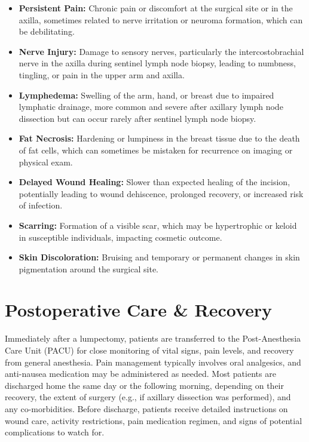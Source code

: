 \begin{itemize}
\begin{itemize}
      \item \textbf{Persistent Pain:} Chronic pain or discomfort at the surgical site or in the axilla, sometimes related to nerve irritation or neuroma formation, which can be debilitating.
      
      \item \textbf{Nerve Injury:} Damage to sensory nerves, particularly the intercostobrachial nerve in the axilla during sentinel lymph node biopsy, leading to numbness, tingling, or pain in the upper arm and axilla.
      
      \item \textbf{Lymphedema:} Swelling of the arm, hand, or breast due to impaired lymphatic drainage, more common and severe after axillary lymph node dissection but can occur rarely after sentinel lymph node biopsy.
      
      \item \textbf{Fat Necrosis:} Hardening or lumpiness in the breast tissue due to the death of fat cells, which can sometimes be mistaken for recurrence on imaging or physical exam.
      
      \item \textbf{Delayed Wound Healing:} Slower than expected healing of the incision, potentially leading to wound dehiscence, prolonged recovery, or increased risk of infection.
      
      \item \textbf{Scarring:} Formation of a visible scar, which may be hypertrophic or keloid in susceptible individuals, impacting cosmetic outcome.
      
      \item \textbf{Skin Discoloration:} Bruising and temporary or permanent changes in skin pigmentation around the surgical site.
    \end{itemize}
\end{itemize}

\section*{Postoperative Care \& Recovery}
Immediately after a lumpectomy, patients are transferred to the Post-Anesthesia Care Unit (PACU) for close monitoring of vital signs, pain levels, and recovery from general anesthesia. Pain management typically involves oral analgesics, and anti-nausea medication may be administered as needed. Most patients are discharged home the same day or the following morning, depending on their recovery, the extent of surgery (e.g., if axillary dissection was performed), and any co-morbidities. Before discharge, patients receive detailed instructions on wound care, activity restrictions, pain medication regimen, and signs of potential complications to watch for.

